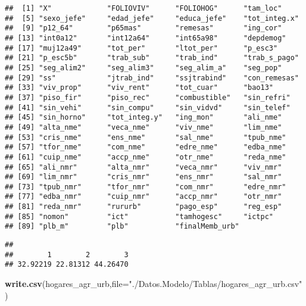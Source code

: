 \documentclass[11pt,]{article}
\newenvironment{Shaded}{\begin{snugshade}}{\end{snugshade}}
\newcommand{\KeywordTok}[1]{\textcolor[rgb]{0.13,0.29,0.53}{\textbf{#1}}}
\newcommand{\DataTypeTok}[1]{\textcolor[rgb]{0.13,0.29,0.53}{#1}}
\newcommand{\DecValTok}[1]{\textcolor[rgb]{0.00,0.00,0.81}{#1}}
\newcommand{\StringTok}[1]{\textcolor[rgb]{0.31,0.60,0.02}{#1}}
\newcommand{\OperatorTok}[1]{\textcolor[rgb]{0.81,0.36,0.00}{\textbf{#1}}}
\newcommand{\NormalTok}[1]{#1}
\begin{document}
\begin{verbatim}
##  [1] "X"             "FOLIOVIV"      "FOLIOHOG"      "tam_loc"      
##  [5] "sexo_jefe"     "edad_jefe"     "educa_jefe"    "tot_integ.x"  
##  [9] "p12_64"        "p65mas"        "remesas"       "ing_cor"      
## [13] "int0a12"       "int12a64"      "int65a98"      "depdemog"     
## [17] "muj12a49"      "tot_per"       "ltot_per"      "p_esc3"       
## [21] "p_esc5b"       "trab_sub"      "trab_ind"      "trab_s_pago"  
## [25] "seg_alim2"     "seg_alim3"     "seg_alim_a"    "seg_pop"      
## [29] "ss"            "jtrab_ind"     "ssjtrabind"    "con_remesas"  
## [33] "viv_prop"      "viv_rent"      "tot_cuar"      "bao13"        
## [37] "piso_fir"      "piso_rec"      "combustible"   "sin_refri"    
## [41] "sin_vehi"      "sin_compu"     "sin_vidvd"     "sin_telef"    
## [45] "sin_horno"     "tot_integ.y"   "ing_mon"       "ali_nme"      
## [49] "alta_nme"      "veca_nme"      "viv_nme"       "lim_nme"      
## [53] "cris_nme"      "ens_nme"       "sal_nme"       "tpub_nme"     
## [57] "tfor_nme"      "com_nme"       "edre_nme"      "edba_nme"     
## [61] "cuip_nme"      "accp_nme"      "otr_nme"       "reda_nme"     
## [65] "ali_nmr"       "alta_nmr"      "veca_nmr"      "viv_nmr"      
## [69] "lim_nmr"       "cris_nmr"      "ens_nmr"       "sal_nmr"      
## [73] "tpub_nmr"      "tfor_nmr"      "com_nmr"       "edre_nmr"     
## [77] "edba_nmr"      "cuip_nmr"      "accp_nmr"      "otr_nmr"      
## [81] "reda_nmr"      "rururb"        "pago_esp"      "reg_esp"      
## [85] "nomon"         "ict"           "tamhogesc"     "ictpc"        
## [89] "plb_m"         "plb"           "finalMemb_urb"
\end{verbatim}

\begin{Shaded}
\end{Shaded}

\begin{verbatim}
## 
##        1        2        3 
## 32.92219 22.81312 44.26470
\end{verbatim}

\begin{Shaded}
\begin{Highlighting}[]
\KeywordTok{write.csv}\NormalTok{(hogares_agr_urb,}\DataTypeTok{file=}\StringTok{"./Datos.Modelo/Tablas/hogares_agr_urb.csv"}\NormalTok{)}
\end{Highlighting}
\end{Shaded}
\end{document}
